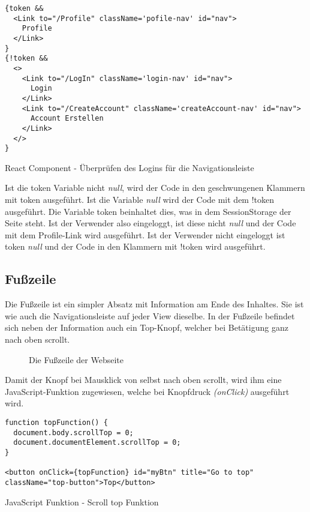 \begin{code}[htp]
\begin{lstlisting}
{token && 
  <Link to="/Profile" className='pofile-nav' id="nav">
    Profile
  </Link>
}
{!token &&
  <>
    <Link to="/LogIn" className='login-nav' id="nav">
      Login
    </Link>
    <Link to="/CreateAccount" className='createAccount-nav' id="nav">
      Account Erstellen
    </Link>
  </>
}
\end{lstlisting}
\caption{React Component - Überprüfen des Logins für die Navigationsleiste}
\end{code}

Ist die token Variable nicht \textit{null}, wird der Code in den geschwungenen Klammern 
mit token ausgeführt. Ist die Variable \textit{null} wird der Code mit dem !token ausgeführt. 
Die Variable token beinhaltet dies, was in dem SessionStorage der Seite steht. Ist der Verwender also eingeloggt, ist diese 
nicht \textit{null} und der Code mit dem Profile-Link wird ausgeführt. Ist der Verwender nicht eingeloggt ist token 
\textit{null} und der Code in den Klammern mit !token wird ausgeführt.

\subsection{Fußzeile}
\label{footer}

Die Fußzeile ist ein simpler Absatz mit Information am Ende des Inhaltes.
Sie ist wie auch die Navigationsleiste auf jeder View dieselbe. In der Fußzeile befindet sich neben 
der Information auch ein Top-Knopf, welcher bei Betätigung ganz nach oben scrollt. 

\begin{figure}[H]
    \begin{center}
      \caption{Die Fußzeile der Webseite}
    \end{center}
\end{figure}

Damit der Knopf bei Mausklick von selbst nach oben scrollt, wird ihm eine JavaScript-Funktion 
zugewiesen, welche bei Knopfdruck \textit{(onClick)} ausgeführt wird.

\begin{code}[htp]
\begin{lstlisting}
function topFunction() {
  document.body.scrollTop = 0;
  document.documentElement.scrollTop = 0;
}

<button onClick={topFunction} id="myBtn" title="Go to top" className="top-button">Top</button>
\end{lstlisting}
\caption{JavaScript Funktion - Scroll top Funktion}
\end{code}


